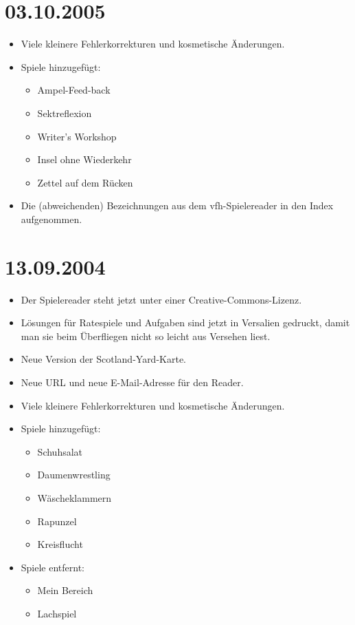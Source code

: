 \section*{03.10.2005}
\begin{itemize}
  \item Viele kleinere Fehlerkorrekturen und kosmetische Änderungen.
  \item Spiele hinzugefügt:
  \begin{itemize}
    \item Ampel-Feed-back
    \item Sektreflexion
    \item Writer's Workshop
    \item Insel ohne Wiederkehr
    \item Zettel auf dem Rücken
  \end{itemize}
  \item Die (abweichenden) Bezeichnungen aus dem vfh-Spielereader in den Index aufgenommen.
\end{itemize}

\section*{13.09.2004}
\begin{itemize}
  \item Der Spielereader steht jetzt unter einer Creative-Commons-Lizenz.
  \item Lösungen für Ratespiele und Aufgaben sind jetzt in Versalien gedruckt, damit man sie beim Überfliegen nicht so leicht aus Versehen liest.
  \item Neue Version der Scotland-Yard-Karte.
  \item Neue URL und neue E-Mail-Adresse für den Reader.
  \item Viele kleinere Fehlerkorrekturen und kosmetische Änderungen.
  \item Spiele hinzugefügt:
  \begin{itemize}
    \item Schuhsalat
    \item Daumenwrestling
    \item Wäscheklammern
    \item Rapunzel
    \item Kreisflucht
  \end{itemize}
  \item Spiele entfernt:
  \begin{itemize}
    \item Mein Bereich
    \item Lachspiel
  \end{itemize}
\end{itemize}
